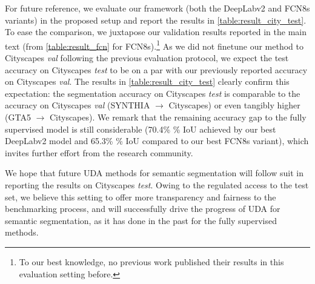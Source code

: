 For future reference, we evaluate our framework (both the DeepLabv2 and FCN8s variants) in the proposed setup and report the results in \cref{table:result_city_test}.
To ease the comparison, we juxtapose our validation results reported in the main text (from \cref{table:result_fcn} for FCN8s).\footnote{To our best knowledge, no previous work published their results in this evaluation setting before.}
As we did not finetune our method to Cityscapes \emph{val} following the previous evaluation protocol, we expect the test accuracy on Cityscapes \emph{test} to be on a par with our previously reported accuracy on Cityscapes \emph{val}.
The results in \cref{table:result_city_test} clearly confirm this expectation: the segmentation accuracy on Cityscapes \emph{test} is comparable to the accuracy on Cityscapes \emph{val} (SYNTHIA $\rightarrow$ Cityscapes) or even tangibly higher (GTA5 $\rightarrow$ Cityscapes).
We remark that the remaining accuracy gap to the fully supervised model is still considerable (70.4\% \% IoU achieved by our best DeepLabv2 model and 65.3\% \% IoU compared to our best FCN8s variant), which invites further effort from the research community.

We hope that future UDA methods for semantic segmentation will follow suit in reporting the results on Cityscapes \emph{test}.
Owing to the regulated access to the test set, we believe this setting to offer more transparency and fairness to the benchmarking process, and will successfully drive the progress of UDA for semantic segmentation, as it has done in the past for the fully supervised methods.
